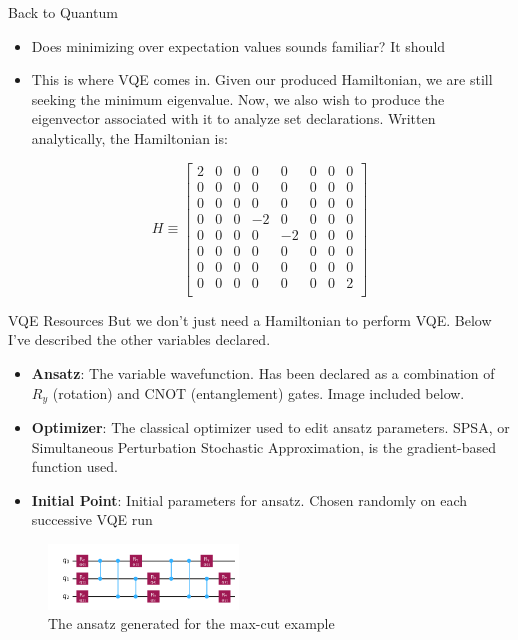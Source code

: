 \begin{frame}{Back to Quantum}
    \begin{itemize}
        \item Does minimizing over expectation values sounds familiar? It should
        \item This is where VQE comes in. Given our produced Hamiltonian, we are still seeking the minimum eigenvalue. Now, we also wish to produce the eigenvector associated with it to analyze set declarations. Written analytically, the Hamiltonian is: 
    \end{itemize}
    \begin{equation}
        H \equiv \begin{bmatrix}
        2 & 0 & 0 & 0 & 0 & 0 & 0 & 0 \\
        0 & 0 & 0 & 0 & 0 & 0 & 0 & 0 \\
        0 & 0 & 0 & 0 & 0 & 0 & 0 & 0 \\
        0 & 0 & 0 & -2 & 0 & 0 & 0 & 0 \\
        0 & 0 & 0 & 0 & -2 & 0 & 0 & 0 \\
        0 & 0 & 0 & 0 & 0 & 0 & 0 & 0 \\
        0 & 0 & 0 & 0 & 0 & 0 & 0 & 0 \\
        0 & 0 & 0 & 0 & 0 & 0 & 0 & 2 \\
    \end{bmatrix}
    \end{equation}
    
\end{frame}


\begin{frame}{VQE Resources}
But we don't just need a Hamiltonian to perform VQE. Below I've described the other variables declared.
    \begin{itemize}
        \item \textbf{Ansatz}: The variable wavefunction. Has been declared as a combination of $R_y$ (rotation) and CNOT (entanglement) gates. Image included below.
        \item \textbf{Optimizer}: The classical optimizer used to edit ansatz parameters. SPSA, or Simultaneous Perturbation Stochastic Approximation, is the gradient-based function used.
        \item \textbf{Initial Point}: Initial parameters for ansatz. Chosen randomly on each successive VQE run
    \end{itemize}

    \begin{figure}
        \centering
        \includegraphics[width=0.45\textwidth]{400/anssatz.png}
        \caption{The ansatz generated for the max-cut example}
        \label{fig:enter-labela}
    \end{figure}
\end{frame}


